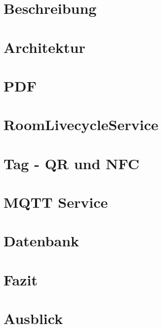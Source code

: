\section{Beschreibung}
\label{sec:Allgemeine Beschreibung}
\section{Architektur}
\label{sec:Architektur}
\section{PDF}
\label{sec:PDF}
\section{RoomLivecycleService}
\label{sec:RoomLivecycleService}
\section{Tag - QR und NFC}
\label{sec:Tag - QR und NFC}
\section{MQTT Service}
\label{sec:MQTT Service}
\section{Datenbank}
\label{sec:Datenbank}
\section{Fazit}
\label{sec:Fazit}
\section{Ausblick}
\label{sec:Ausblick}